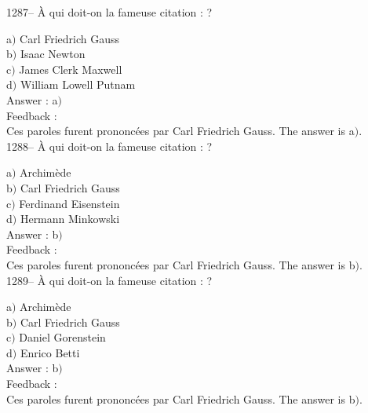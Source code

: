\documentclass[letterpaper, 12pt]{article}
\begin{document}
1287-- \`A qui doit-on la fameuse citation : \fg?

a$)$ Carl Friedrich Gauss \\
b$)$ Isaac Newton \\
c$)$ James Clerk Maxwell \\
d$)$ William Lowell Putnam\\

Answer : a$)$\\

Feedback : \\
Ces paroles furent prononc\'ees par Carl Friedrich Gauss.
The answer is  a$)$.\\

1288-- \`A qui doit-on la fameuse citation : \fg ?

a$)$ Archim\`ede \\
b$)$ Carl Friedrich Gauss \\
c$)$ Ferdinand Eisenstein \\
d$)$ Hermann Minkowski\\

Answer : b$)$\\

Feedback : \\
Ces paroles furent prononc\'ees par Carl Friedrich Gauss.
The answer is  b$)$.\\

1289-- \`A qui doit-on la fameuse citation : \fg ?

a$)$ Archim\`ede \\
b$)$ Carl Friedrich Gauss \\
c$)$ Daniel Gorenstein \\
d$)$ Enrico Betti\\

Answer : b$)$\\

Feedback : \\
Ces paroles furent prononc\'ees par Carl Friedrich Gauss.
The answer is  b$)$.\\
\end{document}
